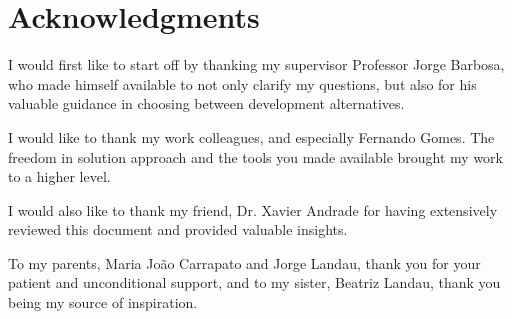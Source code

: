 \chapter*{Acknowledgments}

I would first like to start off by thanking my supervisor Professor Jorge
Barbosa, who made himself available to not only clarify my questions, but also
for his valuable guidance in choosing between development alternatives.

I would like to thank my work colleagues, and especially Fernando Gomes. The
freedom in solution approach and the tools you made available brought my work
to a higher level. 

I would also like to thank my friend, Dr. Xavier Andrade for having
extensively reviewed this document and provided valuable insights.

To my parents, Maria João Carrapato and Jorge Landau, thank you for your
patient and unconditional support, and to my sister, Beatriz Landau, thank you
being my source of inspiration. 

\vspace{10mm}
